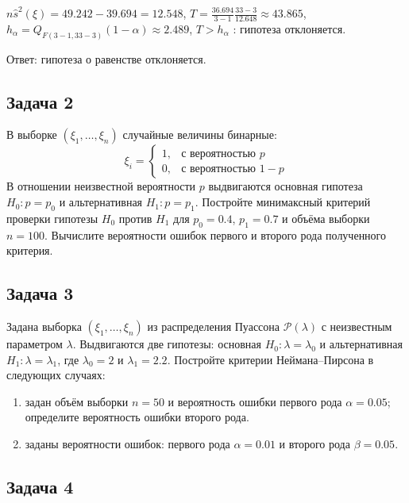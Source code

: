 \documentclass[a4paper,12pt]{article}
\begin{document}
    $n \widehat{s}^2(\xi) = 49.242 - 39.694 = 12.548$,
    $T = \frac{36.694}{3-1} \frac{33 - 3}{12.648} \approx 43.865$,
    $h_\alpha = Q_{F(3-1,33-3)}(1 - \alpha) \approx 2.489$,
    $T > h_\alpha$ : гипотеза отклоняется.

    Ответ: гипотеза о равенстве отклоняется.
\fi

\subsection*{Задача 2}

В выборке $\left( \xi_1, \dots, \xi_n \right)$ случайные величины бинарные:
\[
    \xi_i
    = \left \{
    \begin{array}{ll}
        1, & \text{с вероятностью } p   \\
        0, & \text{с вероятностью } 1-p
    \end{array}
    \right .
\]
В отношении неизвестной вероятности $p$ выдвигаются основная гипотеза $H_0: p = p_0$ и альтернативная $H_1: p = p_1$. Постройте минимаксный критерий
проверки гипотезы $H_0$ против $H_1$ для $p_0 = 0.4$, $p_1 = 0.7$ и объёма выборки $n = 100$. Вычислите вероятности ошибок первого и второго рода
полученного критерия.

\subsection*{Задача 3}

Задана выборка $\left( \xi_1, \dots, \xi_n \right)$ из распределения Пуассона $\mathcal{P}(\lambda)$ с неизвестным параметром $\lambda$. Выдвигаются
две гипотезы: основная $H_0: \lambda = \lambda_0$ и альтернативная $H_1: \lambda = \lambda_1$, где $\lambda_0 = 2$ и $\lambda_1 = 2.2$. Постройте
критерии Неймана--Пирсона в следующих случаях:
\begin{enumerate}
    \item задан объём выборки $n = 50$ и вероятность ошибки первого рода $\alpha = 0.05$; определите вероятность ошибки второго рода.
    \item заданы вероятности ошибок: первого рода $\alpha = 0.01$ и второго рода $\beta = 0.05$.
\end{enumerate}

\subsection*{Задача 4}
\end{document}
